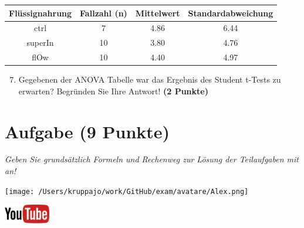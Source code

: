 \documentclass[a4paper, 9pt]{scrartcl}\usepackage[]{graphicx}\usepackage[]{xcolor}
\newenvironment{knitrout}{}{} %
\begin{document}
\begin{knitrout}
\color{fgcolor}\begin{table}[!h]
\centering\begingroup\fontsize{11}{13}\selectfont

\begin{tabular}{cccc}
\toprule
\textbf{Flüssignahrung} & \textbf{Fallzahl (n)} & \textbf{Mittelwert} & \textbf{Standardabweichung}\\
\midrule
ctrl & 7 & 4.86 & 6.44\\
superIn & 10 & 3.80 & 4.76\\
flOw & 10 & 4.40 & 4.97\\
\bottomrule
\end{tabular}
\endgroup{}
\end{table}

\end{knitrout}


\begin{enumerate}
  \setcounter{enumi}{6}
\item Gegebenen der ANOVA Tabelle war das Ergebnis des Student t-Tests zu erwarten? Begründen Sie Ihre Antwort! \textbf{(2 Punkte)}
\end{enumerate}

 
\clearpage

\section{Aufgabe \hfill (9 Punkte)}

\textit{Geben Sie grundsätzlich Formeln und Rechenweg zur Lösung der Teilaufgaben mit an!} \\[1Ex]
 

 
\begin{minipage}[t]{0.5\textwidth}
\texttt{[image: /Users/kruppajo/work/GitHub/exam/avatare/Alex.png]}
\end{minipage}
\begin{minipage}[t]{0.5\textwidth}
\hfill
\href{https://youtu.be/aXvxGC4YLqk}{\includegraphics[width = 2cm]{img/youtube}}\\[1Ex]
\end{minipage}
\vspace{1ex}
\end{document}
